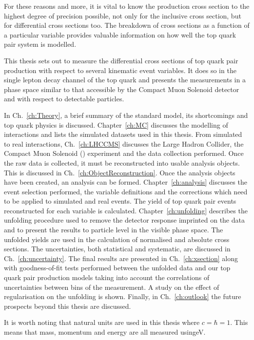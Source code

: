 For these reasons and more, it is vital to know the production cross section to the highest degree of precision possible, not only for the inclusive cross section, but for differential cross sections too.
The breakdown of cross sections as a function of a particular variable provides valuable information on how well the top quark pair system is modelled.

This thesis sets out to measure the differential cross sections of top quark pair production with respect to several kinematic event variables.
It does so in the single lepton decay channel of the top quark and presents the measurements in a phase space similar to that accessible by the Compact Muon Solenoid detector and with respect to detectable particles.

In Ch.~\ref{ch:Theory}, a brief summary of the standard model, its shortcomings and top quark physics is discussed. 
Chapter~\ref{ch:MC} discusses the modelling of interactions and lists the simulated datasets used in this thesis.
From simulated to real interactions, Ch.~\ref{ch:LHCCMS} discusses the Large Hadron Collider, the Compact Muon Solenoid (\CMS) experiment and the data collection performed.
Once the raw data is collected, it must be reconstructed into usable analysis objects.
This is discussed in Ch.~\ref{ch:ObjectReconstruction}.
Once the analysis objects have been created, an analysis can be formed. 
Chapter~\ref{ch:analysis} discusses the event selection performed, the variable definitions and the corrections which need to be applied to simulated and real events.
The yield of top quark pair events reconstructed for each variable is calculated.
Chapter~\ref{ch:unfolding} describes the unfolding procedure used to remove the detector response imprinted on the data and to present the results to particle level in the visible phase space.
The unfolded yields are used in the calculation of normalised and absolute cross sections.
The uncertainties, both statistical and systematic, are discussed in Ch.~\ref{ch:uncertainty}.
The final results are presented in Ch.~\ref{ch:xsection} along with goodness-of-fit tests performed between the unfolded data and our top quark pair production models taking into account the correlations of uncertainties between bins of the measurement.
A study on the effect of regularisation on the unfolding is shown.
Finally, in Ch.~\ref{ch:outlook} the future prospects beyond this thesis are discussed.

It is worth noting that natural units are used in this thesis where $c = \hbar = 1$. This means that mass, momentum and energy are all measured using\unit{eV}.










